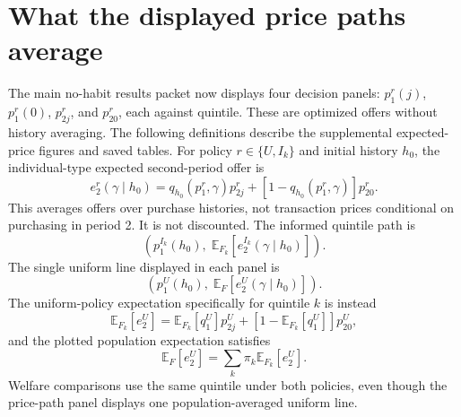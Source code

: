 \documentclass[11pt]{article}
\newcommand{\E}{\mathbb{E}}
\begin{document}
\section{What the displayed price paths average}
The main no-habit results packet now displays four decision panels:
$p_1^r(j)$, $p_1^r(0)$, $p_{2j}^r$, and $p_{20}^r$, each against quintile.
These are optimized offers without history averaging. The following
definitions describe the supplemental expected-price figures and saved tables.
For policy $r\in\{U,I_k\}$ and initial history $h_0$, the individual-type
expected second-period offer is
\begin{equation}
 e_2^r(\gamma\mid h_0)=q_{h_0}(p_1^r,\gamma)p_{2j}^r
 +[1-q_{h_0}(p_1^r,\gamma)]p_{20}^r.
\end{equation}
This averages offers over purchase histories, not transaction prices
conditional on purchasing in period 2. It is not discounted.
The informed quintile path is
\begin{equation}
 \left(p_1^{I_k}(h_0),\;\E_{F_k}[e_2^{I_k}(\gamma\mid h_0)]\right).
\end{equation}
The single uniform line displayed in each panel is
\begin{equation}
 \left(p_1^U(h_0),\;\E_F[e_2^U(\gamma\mid h_0)]\right).
\end{equation}
The uniform-policy expectation specifically for quintile $k$ is instead
\begin{equation}
 \E_{F_k}[e_2^U]=\E_{F_k}[q_1^U]p_{2j}^U
 +[1-\E_{F_k}[q_1^U]]p_{20}^U,
\end{equation}
and the plotted population expectation satisfies
\begin{equation}
 \E_F[e_2^U]=\sum_k\pi_k\E_{F_k}[e_2^U].
\end{equation}
Welfare comparisons use the same quintile under both policies, even though
the price-path panel displays one population-averaged uniform line.
\end{document}
